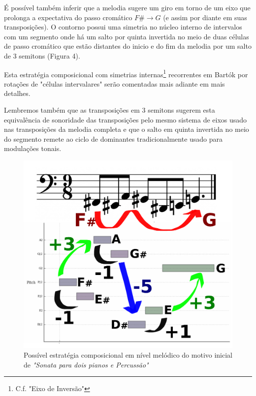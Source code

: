 \documentclass[
	12pt,				%
	openright,			%
	twoside,			%
	a4paper,			%
	english,			%
	french,				%
	spanish,			%
	brazil				%
	]{abntex2}
\begin{document}
É possível também inferir que a melodia sugere um giro em torno de um eixo que prolonga a expectativa do passo cromático $F\# \rightarrow G$ (e assim por diante em suas transposições). O contorno possui uma simetria no núcleo interno de intervalos com um segmento onde há um salto por quinta invertida no meio de duas células de passo cromático que estão distantes do inicio e do fim da melodia por um salto de 3 semitons (Figura 4). 

Esta estratégia composicional com simetrias internas\footnote{C.f. "Eixo de Inversão"\cite[ p.121]{straus2004}} recorrentes em Bartók por rotações de "células intervalares"\cite[ p.128]{susanni_antokoletz2012music} serão comentadas mais adiante em mais detalhes. 

Lembremos também que as transposições em 3 semitons sugerem esta equivalência de sonoridade das transposições pelo mesmo sistema de eixos usado nas transposições da melodia completa e que o salto em quinta invertida no meio do segmento remete ao ciclo de dominantes tradicionalmente usado para modulações tonais.


\begin{figure}[!h]
	\caption{\label{fig_grafico}Possível estratégia composicional em nível melódico do motivo inicial de \textit{"Sonata para dois pianos e Percussão"}}
	\begin{center}
	    \includegraphics[scale=0.4]{axis/temasonata2P.pdf}
	\end{center}
\end{figure}
\end{document}
